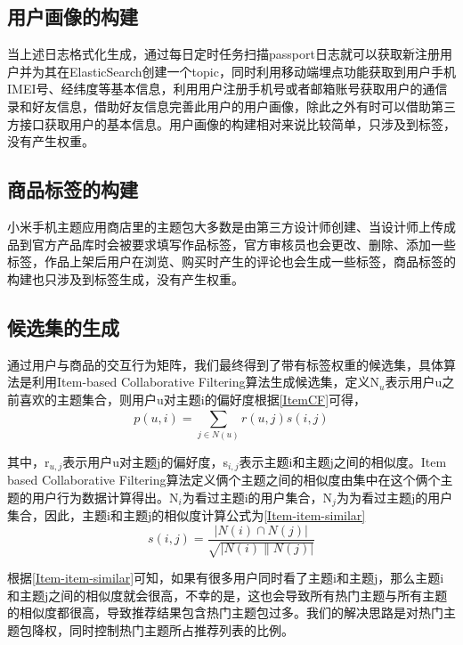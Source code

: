     \subsection{用户画像的构建}
    当上述日志格式化生成，通过每日定时任务扫描passport日志就可以获取新注册用户并为其在ElasticSearch创建一个topic，同时利用移动端埋点功能获取到用户手机IMEI号、经纬度等基本信息，利用用户注册手机号或者邮箱账号获取用户的通信录和好友信息，借助好友信息完善此用户的用户画像，除此之外有时可以借助第三方接口获取用户的基本信息。用户画像的构建相对来说比较简单，只涉及到标签，没有产生权重。

    \subsection{商品标签的构建}
    小米手机主题应用商店里的主题包大多数是由第三方设计师创建、当设计师上传成品到官方产品库时会被要求填写作品标签，官方审核员也会更改、删除、添加一些标签，作品上架后用户在浏览、购买时产生的评论也会生成一些标签，商品标签的构建也只涉及到标签生成，没有产生权重。

    \subsection{候选集的生成}
    通过用户与商品的交互行为矩阵，我们最终得到了带有标签权重的候选集，具体算法是利用Item-based Collaborative Filtering算法生成候选集，定义N$_u$表示用户u之前喜欢的主题集合，则用户u对主题i的偏好度根据\autoref{ItemCF}可得，
    \begin{equation}
    p(u,i)=\sum \limits _{j\in N(u)}^{} r(u,j)s(i,j)
    \label{ItemCF}
    \end{equation}

    其中，r$_{u,j}$表示用户u对主题j的偏好度，s$_{i,j}$表示主题i和主题j之间的相似度。Item based Collaborative Filtering算法定义俩个主题之间的相似度由集中在这个俩个主题的用户行为数据计算得出。N$_{i}$为看过主题i的用户集合，N$_{j}$为为看过主题j的用户集合，因此，主题i和主题j的相似度计算公式为\autoref{Item-item-similar}
    \begin{equation}
    s(i,j)=\frac{\left | N(i)\cap N(j) \right |}{\sqrt{\left | N(i) \parallel N(j) \right |}}
    \label{Item-item-similar}
    \end{equation}

    根据\autoref{Item-item-similar}可知，如果有很多用户同时看了主题i和主题j，那么主题i和主题j之间的相似度就会很高，不幸的是，这也会导致所有热门主题与所有主题的相似度都很高，导致推荐结果包含热门主题包过多。我们的解决思路是对热门主题包降权，同时控制热门主题所占推荐列表的比例。

